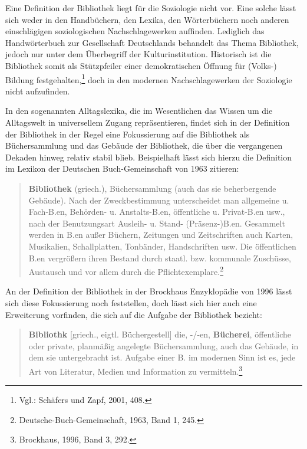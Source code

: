 \documentclass[a4paper,
fontsize=11pt,
oneside,
numbers=noperiodatend,
parskip=half-,
bibliography=totoc,
final
]{scrartcl}
\begin{document}
Eine Definition der Bibliothek liegt für die Soziologie nicht vor. Eine
solche lässt sich weder in den Handbüchern, den Lexika, den
Wörterbüchern noch anderen einschlägigen soziologischen
Nachschlagewerken auffinden. Lediglich das Handwörterbuch zur
Gesellschaft Deutschlands behandelt das Thema Bibliothek, jedoch nur
unter dem Überbegriff der Kulturinstitution. Historisch ist die
Bibliothek somit als Stützpfeiler einer demokratischen Öffnung für
(Volks-) Bildung festgehalten,\footnote{Vgl.: Schäfers und Zapf, 2001,
  408.} doch in den modernen Nachschlagewerken der Soziologie nicht
aufzufinden.

In den sogenannten Alltagslexika, die im Wesentlichen das Wissen um die
Alltagswelt in universellem Zugang repräsentieren, findet sich in der
Definition der Bibliothek in der Regel eine Fokussierung auf die
Bibliothek als Büchersammlung und das Gebäude der Bibliothek, die über
die vergangenen Dekaden hinweg relativ stabil blieb. Beispielhaft lässt
sich hierzu die Definition im Lexikon der Deutschen Buch-Gemeinschaft
von 1963 zitieren:

\begin{quote}
\textbf{Bibliothek} (griech.), Büchersammlung (auch das sie
beherbergende Gebäude). Nach der Zweckbestimmung unterscheidet man
allgemeine u. Fach-B.en, Behörden- u. Anstalts-B.en, öffentliche u.
Privat-B.en usw., nach der Benutzungsart Ausleih- u. Stand-
(Präsenz-)B.en. Gesammelt werden in B.en außer Büchern, Zeitungen und
Zeitschriften auch Karten, Musikalien, Schallplatten, Tonbänder,
Handschriften usw. Die öffentlichen B.en vergrößern ihren Bestand durch
staatl. bzw. kommunale Zuschüsse, Austausch und vor allem durch die
Pflichtexemplare.\footnote{Deutsche-Buch-Gemeinschaft, 1963, Band 1,
  245.}
\end{quote}

An der Definition der Bibliothek in der Brockhaus Enzyklopädie von 1996
lässt sich diese Fokussierung noch feststellen, doch lässt sich hier
auch eine Erweiterung vorfinden, die sich auf die Aufgabe der Bibliothek
bezieht:

\begin{quote}
\textbf{Bibliothk} {[}griech., eigtl. Büchergestell{]} die, -/-en,
\textbf{Bücherei}, öffentliche oder private, planmäßig angelegte
Büchersammlung, auch das Gebäude, in dem sie untergebracht ist. Aufgabe
einer B. im modernen Sinn ist es, jede Art von Literatur, Medien und
Information zu vermitteln.\footnote{Brockhaus, 1996, Band 3, 292.}
\end{quote}
\end{document}
